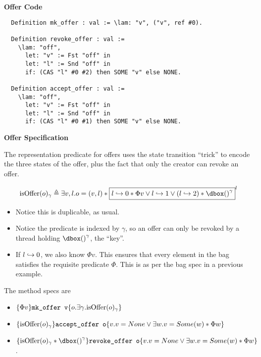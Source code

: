 \textbf{Offer Code}

\begin{verbatim}
  Definition mk_offer : val := \lam: "v", ("v", ref #0).

  Definition revoke_offer : val :=
    \lam: "off",
      let: "v" := Fst "off" in
      let: "l" := Snd "off" in
      if: (CAS "l" #0 #2) then SOME "v" else NONE.

  Definition accept_offer : val :=
    \lam: "off",
      let: "v" := Fst "off" in
      let: "l" := Snd "off" in
      if: (CAS "l" #0 #1) then SOME "v" else NONE.
\end{verbatim}

\textbf{Offer Specification}

The representation predicate for offers uses the state transition ``trick'' to encode the three states of the offer, plus the fact that only the creator can revoke an offer.

\[
\isoffer{o}{\gamma} \triangleq \exists v, l. o = (v, l) * \invm{\pointsto{l}{0} * \Phi v \lor \pointsto{l}{1} \lor (\pointsto{l}{2}) * \ownr{()}{\gamma}}{l}
\]

\begin{itemize}
\item Notice this is duplicable, as usual.
\item Notice the predicate is indexed by $\gamma$, so an offer can only be revoked by a thread holding $\ownr{()}{\gamma}$, the ``key''.
\item If $l \hookrightarrow 0$, we also know $\Phi v$. This ensures that every element in the bag satisfies the requisite predicate $\Phi$. This is as per the bag spec in a previous example.
\end{itemize}

The method specs are
\begin{itemize}

\item $\{\Phi v\} \texttt{mk\_offer v} \{o. \exists \gamma. \text{isOffer}(o)_{\gamma}\}$

\item $\{\text{isOffer}(o)_{\gamma}\} \texttt{accept\_offer o} \{v. v = None \lor \exists w. v = Some(w) * \Phi w \}$

\item $\hot{\isoffer{o}{\gamma} * \ownr{()}{\gamma}}{\texttt{revoke\_offer o}}{v. v = None \lor \exists w. v = Some(w) * \Phi w }$. 
\end{itemize}

